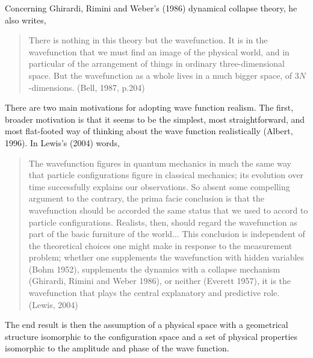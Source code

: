 \noindent Concerning Ghirardi, Rimini and Weber's (1986) dynamical collapse theory, he also writes,

\begin{quote}
There is nothing in this theory but the wavefunction. It is in the wavefunction that we must find an image of the physical world, and in particular of the arrangement of things in ordinary three-dimensional space. But the wavefunction as a whole lives in a much bigger space, of $3N$-dimensions. (Bell, 1987, p.204) %
\end{quote}

There are two main motivations for adopting wave function realism.
The first, broader motivation is that it seems to be the simplest, most straightforward, and most flat-footed way of thinking about the wave function realistically (Albert, 1996). In Lewis's (2004) words,

\begin{quote}
The wavefunction figures in quantum mechanics in much the same way that particle configurations figure in classical mechanics; its evolution over time successfully explains our observations. So absent some compelling argument to the contrary, the prima facie conclusion is that the wavefunction should be accorded the same status that we used to accord to particle configurations. Realists, then, should regard the wavefunction as part of the basic furniture of the world... This conclusion is independent of the theoretical choices one might make in response to the measurement problem; whether one supplements the wavefunction with hidden variables (Bohm 1952), supplements the dynamics with a collapse mechanism (Ghirardi, Rimini and Weber 1986), or neither (Everett 1957), it is the wavefunction that plays the central explanatory and predictive role. (Lewis, 2004)
\end{quote}

\noindent The end result is then the assumption of a physical space with a geometrical structure isomorphic to the configuration space and a set of physical properties isomorphic to the amplitude and phase of the wave function.

